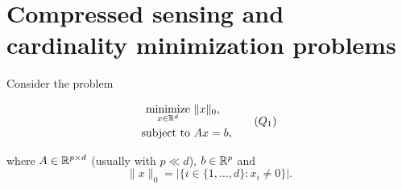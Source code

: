\section{Compressed sensing and cardinality minimization problems}

Consider the problem

\begin{equation}
  \begin{aligned}
    \operatorname*{minimize}\limits_{x\in{\mathbb{R}}^d} & \,\,\|x\|_0, \\
    \mathrm{subject \,\, to}     & \,\, Ax = b,
  \end{aligned}
  \tag{$Q_1$}
\end{equation}

where $A\in{\mathbb{R}}^{p\times d}$ (usually with $p\ll d$), $b\in{\mathbb{R}}^p$ and
$$\|x\|_0 = |\{i\in \{1,\ldots, d\} : x_i \ne 0\}|.$$


